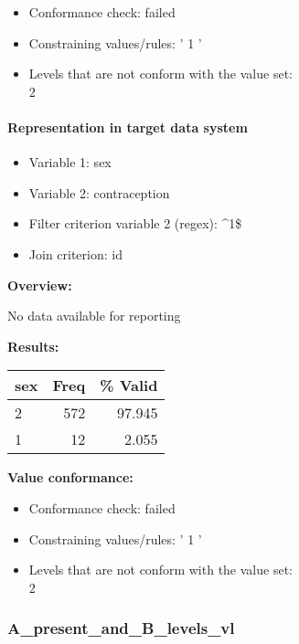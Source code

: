\documentclass[
]{article}
\providecommand{\tightlist}{%
  \setlength{\itemsep}{0pt}\setlength{\parskip}{0pt}}
\begin{document}
\begin{itemize}
\tightlist
\item
  Conformance check: failed
\item
  Constraining values/rules: ' 1 '
\item
  Levels that are not conform with the value set:\\
  2
\end{itemize}

\hypertarget{representation-in-target-data-system-29}{%
\paragraph{Representation in target data
system}\label{representation-in-target-data-system-29}}

\begin{itemize}
\tightlist
\item
  Variable 1: sex
\item
  Variable 2: contraception
\item
  Filter criterion variable 2 (regex): \^{}1\$
\item
  Join criterion: id
\end{itemize}

\textbf{Overview:}

No data available for reporting

\textbf{Results:}\\

\begin{table}[H]
\centering
\begin{tabular}{l|r|r}
\hline
\textbf{sex} & \textbf{Freq} & \textbf{\% Valid}\\
\hline
2 & 572 & 97.945\\
\hline
1 & 12 & 2.055\\
\hline
\end{tabular}
\end{table}

\textbf{Value conformance:}

\begin{itemize}
\tightlist
\item
  Conformance check: failed
\item
  Constraining values/rules: ' 1 '
\item
  Levels that are not conform with the value set:\\
  2
\end{itemize}

\hypertarget{a_present_and_b_levels_vl}{%
\subsubsection{A\_present\_and\_B\_levels\_vl}\label{a_present_and_b_levels_vl}}
\end{document}
